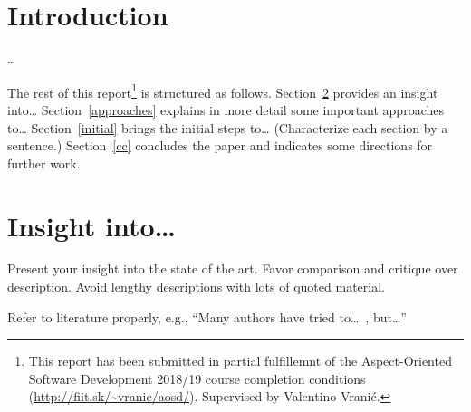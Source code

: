 \documentclass[11pt,english,a4paper,twoside]{article}
\title{\reporttitle}
\author{Author Name} %
\date{Institute of Informatics, Information Systems and Software Engineering\\
      Faculty of Informatics and Information Technologies\\
      Slovak University of Technology in Bratislava\\[6pt]
      December 17, 2018} %
\begin{document}
\maketitle

\begin{abstract}
In the abstract, first introduce the context of your work.
Then, state what are your contributions, starting from the most important one (it's fine to have only one contribution, of course).
Explain why your contributions should be considered right.
For this, it's best if you can indicate how you evaluated them.
Finally, position your contributions in a broader context: why are they important, where they can be applied, how they can be extended\ldots

An abstract may repeat the sentences from the main text.
Don't be afraid to modify them, though,
as an abstract has to be short.
It's very likely you'll find the context of your work in the introduction of your paper,
and all the rest you need for your abstract in the concluding section.
\end{abstract}



\section{Introduction} \label{in}

\ldots

The rest of this report\footnote{This report has been submitted in partial fulfillemnt of the Aspect-Oriented Software Development 2018/19 course completion conditions (\url{http://fiit.sk/~vranic/aosd/}). Supervised by Valentino Vranić.}
is structured as follows.
Section~\ref{insight} provides an insight into\ldots{}
Section~\ref{approaches} explains in more detail some important approaches to\ldots{}
Section~\ref{initial} brings the initial steps to\ldots{}
(Characterize each section by a sentence.)
Section~\ref{cc} concludes the paper and indicates some directions for further work.




\section{Insight into\ldots} \label{insight}

Present your insight into the state of the art.
Favor comparison and critique over description.
Avoid lengthy descriptions with lots of quoted material.

Refer to literature properly, e.g.,
``Many authors have tried to\ldots~\cite{Vranic:AJParadigms,Alexander:Timeless}, but\ldots'' 
\end{document}
